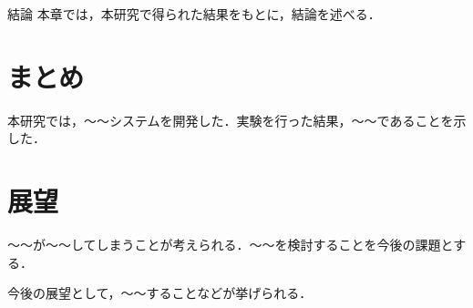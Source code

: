 \chapterhead
{結論}
{本章では，本研究で得られた結果をもとに，結論を述べる．}

\section{まとめ}
本研究では，〜〜システムを開発した．実験を行った結果，〜〜であることを示した．



\section{展望}
〜〜が〜〜してしまうことが考えられる．〜〜を検討することを今後の課題とする．\par
今後の展望として，〜〜することなどが挙げられる．

\newpage

